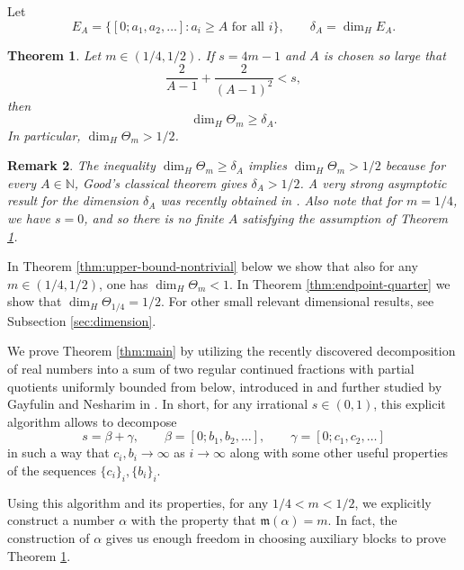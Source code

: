 \documentclass[11pt]{amsart}
\newtheorem{theorem}{Theorem}[section]
\newtheorem{remark}[theorem]{Remark}
\newcommand{\N}{\mathbb N}
\begin{document}
Let
$$
        E_A=\{[0;a_1,a_2,\ldots]: a_i\ge A\text{ for all }i\},
        \qquad
        \delta_A=\dim_{H}E_A.
$$
\begin{theorem}\label{thm:large-digit-dimension}
Let $m\in(1/4,1/2)$. If $s=4m-1$ and $A$ is chosen so large that
$$
        \frac{2}{A-1}+\frac{2}{(A-1)^2}<s,
$$
then 
$$
        \dim_{H}\Theta_m\ge \delta_A.
$$
In particular, $\dim_H \Theta_m >1/2$.
\end{theorem}

\begin{remark}
The inequality $\dim_{H}\Theta_m\ge \delta_A$ implies $\dim_H \Theta_m >1/2$ because for every $A\in\N$, Good's classical theorem \cite{Good1941} gives $\delta_A>1/2$. A very strong asymptotic result for the dimension $\delta_A$ was recently obtained in \cite{MR4540838}. Also note that for $m=1/4$, we have $s=0$, and so there is no finite $A$ satisfying the assumption of Theorem \ref{thm:large-digit-dimension}.
\end{remark}




In Theorem \ref{thm:upper-bound-nontrivial} below we show that also for any $m\in(1/4,1/2)$, one has $\dim_H \Theta_m <1$. In Theorem \ref{thm:endpoint-quarter} we show that $\dim_H \Theta_{1/4} = 1/2$. For other small relevant dimensional results, see Subsection \ref{sec:dimension}.






We prove Theorem \ref{thm:main} by utilizing the recently discovered decomposition of real numbers into a sum of two regular continued fractions with partial quotients uniformly bounded from below, introduced in \cite{ShulgaCusick} and further studied by Gayfulin and Nesharim in \cite{gayfulin2025realnumbersumreal}. In short, for any irrational $s\in(0,1)$, this explicit algorithm allows to decompose 
$$
        s=\beta+\gamma,
        \qquad
        \beta=[0;b_1,b_2,\ldots],
        \qquad
        \gamma=[0;c_1,c_2,\ldots]
$$
in such a way that $c_i,b_i\to\infty$ as $i\to\infty$ along with some other useful properties of the sequences $\{c_i\}_i,\{b_i\}_i$.


Using this algorithm and its properties, for any $1/4<m<1/2$, we explicitly construct a number $\alpha$ with the property that $\mathfrak{m}(\alpha)=m$. In fact, the construction of $\alpha$ gives us enough freedom in choosing auxiliary blocks to prove Theorem \ref{thm:large-digit-dimension}.
\end{document}
